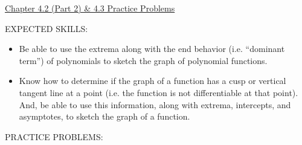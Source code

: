 \documentclass[12pt]{article}
\begin{document}
\begin{center}
\underline{\LARGE{Chapter 4.2 (Part 2) \& 4.3 Practice Problems}}
\end{center}

\noindent EXPECTED SKILLS:

\begin{itemize}

\item Be able to use the extrema along with the end behavior (i.e. “dominant term”) of polynomials to sketch the graph of polynomial
functions.

\item Know how to determine if the graph of a function has a cusp or vertical tangent line at a point (i.e. the function is not differentiable at that point).  And, be able to use this information, along with extrema, intercepts, and asymptotes, to sketch the graph of a function.

\end{itemize}

\noindent PRACTICE PROBLEMS:

\medskip

\end{document}
